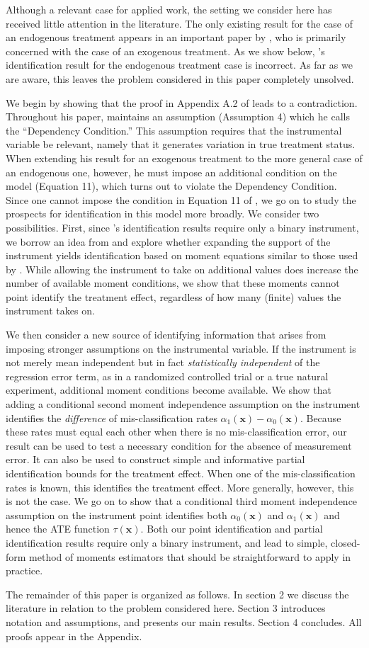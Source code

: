 Although a relevant case for applied work, the setting we consider here has received little attention in the literature.
The only existing result for the case of an endogenous treatment appears in an important paper by \cite{Mahajan}, who is primarily concerned with the case of an exogenous treatment.
As we show below, \citeauthor{Mahajan}'s identification result for the endogenous treatment case is incorrect.
As far as we are aware, this leaves the problem considered in this paper completely unsolved.

We begin by showing that the proof in Appendix A.2 of \cite{Mahajan} leads to a contradiction.
Throughout his paper, \cite{Mahajan} maintains an assumption (Assumption 4) which he calls the ``Dependency Condition.'' 
This assumption requires that the instrumental variable be relevant, namely that it generates variation in true treatment status.
When extending his result for an exogenous treatment to the more general case of an endogenous one, however, he must impose an additional condition on the model (Equation 11), which turns out to violate the Dependency Condition.
Since one cannot impose the condition in Equation 11 of \cite{Mahajan}, we go on to study the prospects for identification in this model more broadly.
We consider two possibilities.
First, since \citeauthor{Mahajan}'s identification results require only a binary instrument,  we borrow an idea from \cite{Lewbel} and explore whether expanding the support of the instrument yields identification based on moment equations similar to those used by \cite{Mahajan}.
While allowing the instrument to take on additional values does increase the number of available moment conditions, we show that these moments cannot point identify the treatment effect, regardless of how many (finite) values the instrument takes on.

We then consider a new source of identifying information that arises from imposing stronger assumptions on the instrumental variable.
If the instrument is not merely mean independent but in fact \emph{statistically independent} of the regression error term, as in a randomized controlled trial or a true natural experiment, additional moment conditions become available.
We show that adding a conditional second moment independence assumption on the instrument identifies the \emph{difference} of mis-classification rates $\alpha_1(\mathbf{x})-\alpha_0(\mathbf{x})$. 
Because these rates must equal each other when there is no mis-classification error, our result can be used to test a necessary condition for the absence of measurement error.   
It can also be used to construct simple and informative partial identification bounds for the treatment effect.
When one of the mis-classification rates is known, this identifies the treatment effect.
More generally, however, this is not the case.
We go on to show that a conditional third moment independence assumption on the instrument point identifies both $\alpha_0(\mathbf{x})$ and $\alpha_1(\mathbf{x})$ and hence the ATE function $\tau(\mathbf{x})$. 
Both our point identification and partial identification results require only a binary instrument, and lead to simple, closed-form method of moments estimators that should be straightforward to apply in practice.

The remainder of this paper is organized as follows. 
In section 2 we discuss the literature in relation to the problem considered here. 
Section 3 introduces notation and assumptions, and presents our main results.
Section 4 concludes.
All proofs appear in the Appendix.

